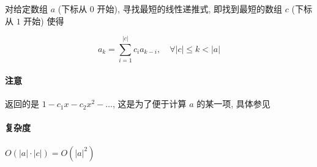 对给定数组 \(a\) (下标从 \(0\) 开始), 寻找最短的线性递推式, 即找到最短的数组 \(c\) (下标从 \(1\) 开始) 使得

\[
    a_k=\sum_{i=1}^{|c|} c_i a_{k-i},\quad \forall |c|\leq k < |a|
\]

\paragraph{注意}

返回的是 \(1-c_1 x -c_2 x^2-\dots\), 这是为了便于计算 \(a\) 的某一项, 具体参见 

\paragraph{复杂度} 

\(O(|a|\cdot |c|)=O\left(|a|^2\right)\)